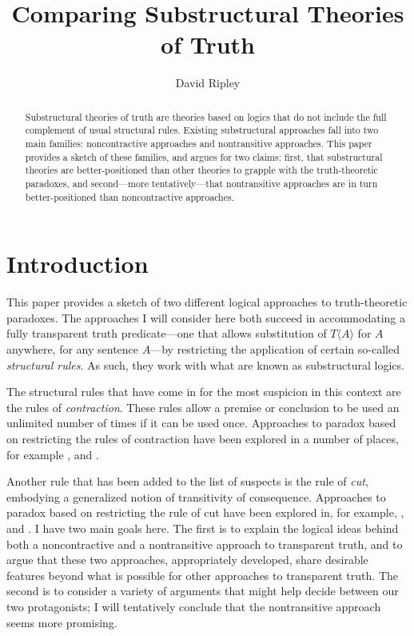 \documentclass{ergoclass}
\title{Comparing Substructural \titlelinebreak Theories of Truth}
\author{David Ripley}
\affiliation{University of Connecticut}
\newcommand{\Tname}[1]{\T\name{#1}}
\newcommand{\name}[1]{\ensuremath{\langle #1 \rangle}}
\newcommand{\T}{\ensuremath{T}}
\renewcommand{\cite}{\citet}						%
\begin{document}
\maketitle
\begin{abstract}
Substructural theories of truth are theories based on logics that do not include the full
complement of usual structural rules. Existing substructural approaches fall into two
main families: noncontractive approaches and nontransitive approaches. This paper
provides a sketch of these families, and argues for two claims: first, that substructural
theories are better-positioned
than other theories to grapple with the truth-theoretic
paradoxes, and second---more
tentatively---that
nontransitive approaches are in turn
better-positioned
than noncontractive approaches.
\end{abstract}
\section{Introduction}

This paper provides a sketch of two different logical approaches to truth-theoretic paradoxes. The approaches I will consider here both succeed in accommodating a fully transparent truth predicate---one that allows substitution of $\Tname{A}$ for $A$ anywhere, for any sentence $A$---by restricting the application of certain so-called {\em structural rules}. As such, they work with what are known as substructural logics.

The structural rules that have come in for the most suspicion in this context are the rules of {\em contraction}. These rules allow a premise or conclusion to be used an unlimited number of times if it can be used once. Approaches to paradox based on restricting the rules of contraction have been explored in a number of places, for example \cite{bm:2curry, grishin:pstclwc, petersen:lwciua, restall:lwc, shapiro:dlc}, and \cite{zardini:twc}.

Another rule that has been added to the list of suspects is the rule of {\em cut}, embodying a generalized notion of transitivity of consequence. Approaches to paradox based on restricting the rule of cut have been explored in, for example, \citet*{cervr:rtt, ripley:pafc}, and \cite{weir:ntsl}. I have two main goals here. The first is to explain the logical ideas behind both a noncontractive and a nontransitive approach to transparent truth, and to argue that these two approaches, appropriately developed, share desirable features beyond what is possible for other approaches to transparent truth. The second is to consider a variety of arguments that might help decide between our two protagonists; I will tentatively conclude that the nontransitive approach seems more promising.
\end{document}
